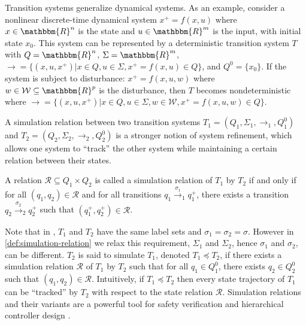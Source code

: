 \begin{example}
  Transition systems generalize dynamical systems. As an
  example, consider a nonlinear discrete-time dynamical system $x^+ = f (x,
  u)$ where $x \in \mathbbm{R}^n$ is the state and $u \in \mathbbm{R}^m$ is
  the input, with initial state $x_{0}$.
  This system can be represented by a deterministic transition
  system $T$ with $Q =\mathbbm{R}^n$, $\Sigma =\mathbbm{R}^m$,
  $\rightarrow = \{ (x, u, x^+) |x \in Q, u \in \Sigma, x^+ = f (x, u) \in Q
  \}$, and $Q^{0} = \{x_{0}\}$.
  If the system is subject to disturbance: $x^+ = f (x, u, w)$ where
  $w \in \mathcal{W} \subseteq \mathbbm{R}^p$ is the disturbance, then $T$
  becomes nondeterministic where $\rightarrow = \{ (x, u, x^+) |x \in Q, u \in
  \Sigma, w \in \mathcal{W}, x^+ = f (x, u, w) \in Q \}$.
\end{example}

A simulation relation between two transition systems $T_1 = (Q_1, \Sigma_1,
\rightarrow_1, Q^0_1)$ and $T_2 = (Q_2, \Sigma_2, \rightarrow_2, Q^0_2)$ is a
stronger notion of system refinement, which allows one system to ``track'' the
other system while maintaining a certain relation between their states.

\begin{definition}[Simulation]
  \label{def:simulation-relation}A relation $\mathcal{R} \subseteq Q_1 \times
  Q_2$ is called a simulation relation of $T_1$ by $T_2$ if and only if for all $(q_1,
  q_2) \in \mathcal{R}$ and for all transitions $q_1 \xrightarrow{\sigma_1}_{1}
  q^+_1$, there exists a transition $q_2 \xrightarrow{\sigma_2}_{2}
  q^+_2$ such that $(q_1^+, q_2^+) \in \mathcal{R}$.
\end{definition}

Note that in \cite{girardetal07amd}, %
$T_1$ and $T_2$ have the same
label sets and $\sigma_{1} = \sigma_2 = \sigma$. %
However in \cref{def:simulation-relation} we %
relax this requirement, \ie $\Sigma_1$ and $\Sigma_2$, hence $\sigma_{1}$ and $\sigma_{2}$, can be different.
$T_2$ is said to simulate $T_1$, denoted $T_1 \preceq T_2$, if there exists a
simulation relation $\mathcal{R}$ of $T_1$ by $T_2$ such that for all $q_1 \in
Q^0_1$, there exists $q_2 \in Q^0_2$ such that $(q_1, q_2) \in \mathcal{R}$.
Intuitively, if $T_1 \preceq T_2$ then every state trajectory of $T_1$ can be
``tracked'' by $T_2$ with respect to the state relation $\mathcal{R}$.
Simulation relations and their variants are a powerful tool for safety verification and
hierarchical controller design \cite{girardetal07amd,clarkeetal99m,pappasetal00hcc,GirardEtAl06vus}.

